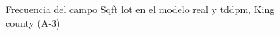 \begin{figure}[H]
    \centering
    
    \caption{Frecuencia del campo Sqft lot en el modelo real y tddpm, King county (A-3)}
    \label{frecuency-tddpm-sqft lot}
\end{figure}